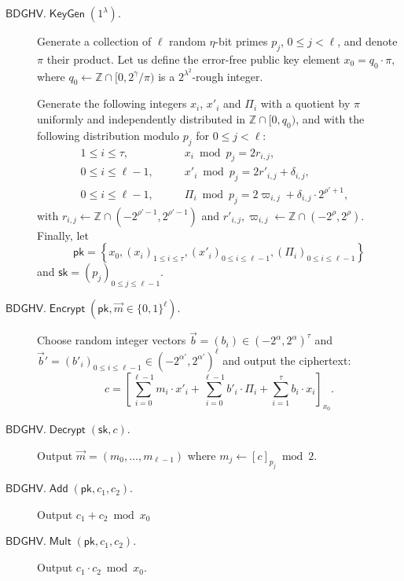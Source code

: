\documentclass{llncs}
\renewcommand\leq\leqslant
\newcommand{\Z}{{\mathbb Z}}
\DeclareMathOperator{\KeyGen}{\ensuremath{\mathsf{KeyGen}}}
\DeclareMathOperator{\Encrypt}{\ensuremath{\mathsf{Encrypt}}}
\DeclareMathOperator{\Decrypt}{\ensuremath{\mathsf{Decrypt}}}
\DeclareMathOperator{\Add}{\ensuremath{\mathsf{Add}}}
\DeclareMathOperator{\Mult}{\ensuremath{\mathsf{Mult}}}
\newcommand*{\pk}{\ensuremath{\mathsf{pk}}}
\newcommand*{\sk}{\ensuremath{\mathsf{sk}}}
\newcommand*{\BDGHV}{\ensuremath{\mathsf{BDGHV}}}
\begin{document}
\begin{description}
\item[$\BDGHV.\KeyGen(1^\lambda)$.] Generate a collection of $\ell$
random $\eta$-bit primes $p_j$, $0\leq j<\ell$, and denote $\pi$
their product. Let us define the error-free public key element
$x_0=q_0\cdot\pi$, where $q_0 \leftarrow \Z \cap [0,2^{\gamma}/\pi)$
  is a $2^{\lambda^2}$-rough integer.

  Generate the following integers $x_i$, $x'_i$ and $\varPi_i$ with a quotient by $\pi$ uniformly
  and independently distributed in $\Z\cap [0, q_0)$, and with the
    following distribution modulo $p_j$ for $0 \leq j < \ell$:
$$
\begin{array}{lll}
1 \leq i \leq \tau, & \qquad x_i\bmod p_j = 2r_{i,j},& \\[.2cm]

0\leq i\leq \ell-1, & \qquad x'_i\bmod p_j = 2r'_{i,j}+\delta_{i,j},& \\[.2cm]

0\leq i\leq \ell-1, & \qquad \varPi_i \bmod p_j = 2\varpi_{i,j} +
\delta_{i,j}\cdot 2^{\rho'+1},
\end{array}
$$
with $r_{i,j}\leftarrow\Z\cap(-2^{\rho'-1}, 2^{\rho'-1})$ and $r'_{i,j}, \varpi_{i,j}\leftarrow\Z\cap(-2^{\rho}, 2^{\rho})$. Finally, let 
$$\pk = \left\{ x_0, \left(x_i\right)_{1\leq i\leq \tau}, \left(x'_i\right)_{0\leq i\leq \ell-1}, \left(\varPi_i\right)_{0\leq i\leq {\ell-1}}\right\}$$
and $\sk=(p_j)_{0\leq j\leq {\ell-1}}$.

\item[$\BDGHV.\Encrypt(\pk, \vec{m} \in \{0,1\}^\ell)$.] Choose 
  random integer vectors $\vec b=(b_i)%
  \in(-2^\alpha,2^{\alpha})^\tau$ and $\vec b'=(b'_i)_{0\leq i\leq
      \ell-1} \in(-2^{\alpha'},2^{\alpha'})^{\ell}$ 
and output the ciphertext:
\begin{equation}
\label{eq:encbdghv}
c = \left[\sum\limits_{i=0}^{\ell-1} m_i \cdot x'_i + 
	\sum_{i=0}^{\ell-1} b'_i\cdot \varPi_i  + \sum_{i=1}^\tau 
b_i\cdot x_i\right]_{x_0}.
\end{equation}
\item[$\BDGHV.\Decrypt(\sk, c)$.] Output $\vec{m}=(m_0,\ldots,m_{\ell-1})$ where $m_j \leftarrow [c]_{p_j} \bmod 2$.
\\\vspace{-0.25cm}
\item[$\BDGHV.\Add(\pk, c_1, c_2)$.] Output $c_1+c_2 \bmod x_0$
\\\vspace{-0.25cm}
\item[$\BDGHV.\Mult(\pk, c_1, c_2)$.] Output $c_1 \cdot c_2 \bmod x_0$.
\end{description}
\end{document}
